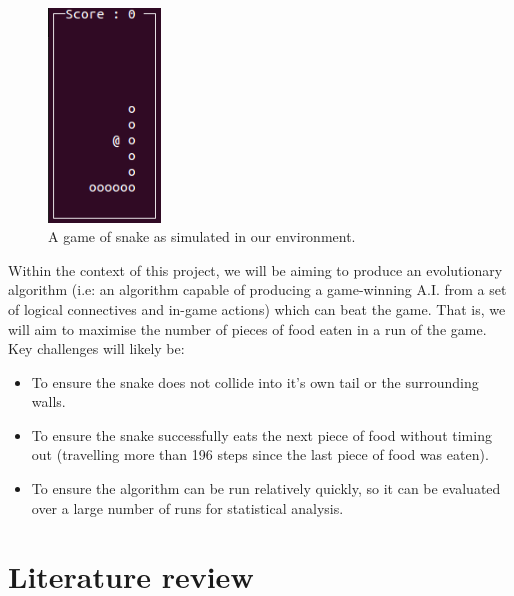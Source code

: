 \documentclass[british,10pt,a4paper]{article}
\begin{document}
\begin{minipage}{0.02\textwidth}
\end{minipage}
\begin{minipage}{0.28\textwidth}
	\begin{figure}[H]
	\centering
		\includegraphics[width=3cm,keepaspectratio]{images/snake.png}
		\caption{A game of snake as simulated in our environment.}
		\label{fig:snake}
	\end{figure}
\end{minipage}

Within the context of this project, we will be aiming to produce an evolutionary algorithm (i.e: an algorithm capable of producing a game-winning A.I. from a set of logical connectives and in-game actions) which can beat the game. That is, we will aim to maximise the number of pieces of food eaten in a run of the game. Key challenges will likely be:
\begin{itemize}
	\item To ensure the snake does not collide into it's own tail or the surrounding walls.
	\item To ensure the snake successfully eats the next piece of food without timing out (travelling more than 196 steps since the last piece of food was eaten).
	\item To ensure the algorithm can be run relatively quickly, so it can be evaluated over a large number of runs for statistical analysis.
\end{itemize}

\section{Literature review}
\end{document}
